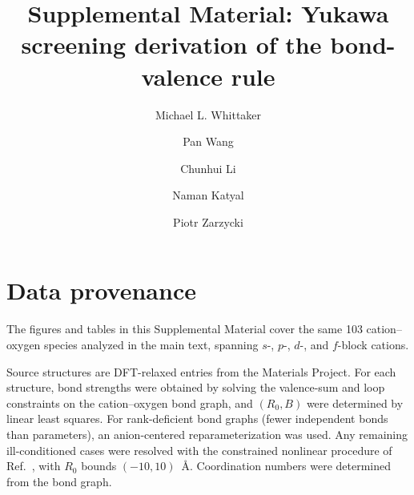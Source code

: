 \documentclass[aps,prmaterials,twocolumn,10pt,superscriptaddress,floatfix]{revtex4-2}
\begin{document}
\title{Supplemental Material: Yukawa screening derivation of the bond-valence rule}

\author{Michael L. Whittaker}
\author{Pan Wang}
\author{Chunhui Li}
\author{Naman Katyal}
\author{Piotr Zarzycki}

\maketitle

\onecolumngrid

\section{Data provenance}

The figures and tables in this Supplemental Material cover the same
103 cation--oxygen species analyzed in the main text, spanning $s$-,
$p$-, $d$-, and $f$-block cations.

Source structures are DFT-relaxed entries from the Materials Project.
For each structure, bond strengths were obtained by solving the
valence-sum and loop constraints on the cation--oxygen bond graph,
and $(R_0,B)$ were determined by linear least squares.  For
rank-deficient bond graphs (fewer independent bonds than parameters),
an anion-centered reparameterization was used.  Any remaining
ill-conditioned cases were resolved with the constrained nonlinear
procedure of Ref.~, with $R_0$ bounds $(-10,10)$~\AA.
Coordination numbers were determined from the bond graph.
\end{document}
